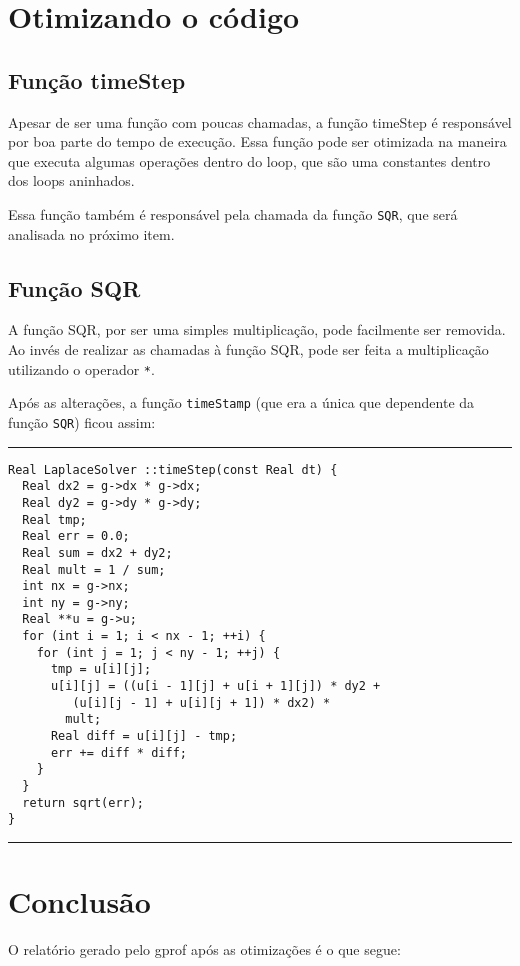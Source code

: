 \documentclass[a4paper,twosidep]{article}
\begin{document}
\section{Otimizando o código}
\label{sec:org82b0288}

\subsection{Função timeStep}
\label{sec:orgf5e68a4}
Apesar de ser uma função com poucas chamadas, a função timeStep é responsável por boa parte do tempo de execução. Essa função pode ser otimizada na maneira que executa algumas operações dentro do loop, que são uma constantes dentro dos loops aninhados.

Essa função também é responsável pela chamada da função \texttt{SQR}, que será analisada no próximo item.

\subsection{Função SQR}
\label{sec:org05df842}
A função SQR, por ser uma simples multiplicação, pode facilmente ser removida. Ao invés de realizar as chamadas à função SQR, pode ser feita a multiplicação utilizando o operador \texttt{*}.


Após as alterações, a função \texttt{timeStamp} (que era a única que dependente da função \texttt{SQR}) ficou assim:

\noindent\rule{\textwidth}{0.5pt}
\begin{verbatim}
Real LaplaceSolver ::timeStep(const Real dt) {
  Real dx2 = g->dx * g->dx;
  Real dy2 = g->dy * g->dy;
  Real tmp;
  Real err = 0.0;
  Real sum = dx2 + dy2;
  Real mult = 1 / sum;
  int nx = g->nx;
  int ny = g->ny;
  Real **u = g->u;
  for (int i = 1; i < nx - 1; ++i) {
    for (int j = 1; j < ny - 1; ++j) {
      tmp = u[i][j];
      u[i][j] = ((u[i - 1][j] + u[i + 1][j]) * dy2 +
		 (u[i][j - 1] + u[i][j + 1]) * dx2) *
		mult;
      Real diff = u[i][j] - tmp;
      err += diff * diff;
    }
  }
  return sqrt(err);
}
\end{verbatim}

\noindent\rule{\textwidth}{0.5pt}

\section{Conclusão}
\label{sec:org072131b}
O relatório gerado pelo gprof após as otimizações é o que segue:
\end{document}
